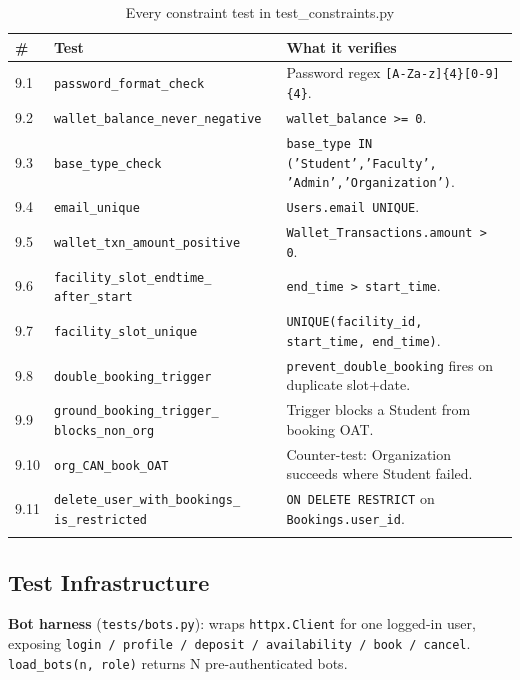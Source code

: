 \documentclass[11pt,a4paper]{article}
\begin{document}
{\footnotesize
\setlength{\tabcolsep}{4pt}
\begin{longtable}{@{}lp{6cm}p{8.5cm}@{}}
\toprule
\textbf{\#} & \textbf{Test} & \textbf{What it verifies} \\
\midrule
\endhead
9.1  & \texttt{password\_format\_check}              & Password regex \texttt{[A-Za-z]\{4\}[0-9]\{4\}}. \\
9.2  & \texttt{wallet\_balance\_never\_negative}     & \texttt{wallet\_balance >= 0}. \\
9.3  & \texttt{base\_type\_check}                    & \texttt{base\_type IN} \texttt{('Student','Faculty',} \texttt{'Admin','Organization')}. \\
9.4  & \texttt{email\_unique}                        & \texttt{Users.email UNIQUE}. \\
9.5  & \texttt{wallet\_txn\_amount\_positive}        & \texttt{Wallet\_Transactions.amount > 0}. \\
9.6  & \texttt{facility\_slot\_endtime\_} \texttt{after\_start} & \texttt{end\_time > start\_time}. \\
9.7  & \texttt{facility\_slot\_unique}               & \texttt{UNIQUE(facility\_id,} \texttt{start\_time, end\_time)}. \\
9.8  & \texttt{double\_booking\_trigger}             & \texttt{prevent\_double\_booking} fires on duplicate slot+date. \\
9.9  & \texttt{ground\_booking\_trigger\_} \texttt{blocks\_non\_org} & Trigger blocks a Student from booking OAT. \\
9.10 & \texttt{org\_CAN\_book\_OAT}                  & Counter-test: Organization succeeds where Student failed. \\
9.11 & \texttt{delete\_user\_with\_bookings\_} \texttt{is\_restricted} & \texttt{ON DELETE RESTRICT} on \texttt{Bookings.user\_id}. \\
\bottomrule
\caption{Every constraint test in test\_constraints.py}
\end{longtable}
}

\subsection{Test Infrastructure}

\textbf{Bot harness} (\texttt{tests/bots.py}): wraps \texttt{httpx.Client} for one logged-in user, exposing \texttt{login / profile / deposit / availability / book / cancel}. \texttt{load\_bots(n, role)} returns N pre-authenticated bots.
\end{document}
